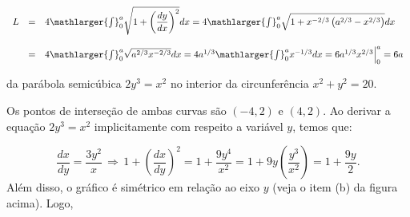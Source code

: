 \cleardoublepage\documentclass[../main.tex]{subfiles}
\begin{document}
\begin{ex}
\begin{compactenum}[a)]
\begin{solution}
\[ \begin{array}{rcl} L&=& 4\mathlarger{\int}^{a}_{0} \sqrt{ 1+ \left(\dfrac{dy}{dx}\right)^2} dx = 4 \mathlarger{\int}^{a}_{0} \sqrt{ 1+ x^{-2/3}\left(a^{2/3} -x^{2/3} \right)} dx \\ \\ &=& 4 \mathlarger{\int}^{a}_{0} \sqrt{ a^{2/3} x^{-2/3}} dx = 4a^{1/3} \mathlarger{\int}^{a}_{0} x^{-1/3} dx = 6 a^{1/3}x^{2/3} \Big{|}^{a}_{0}=6a\end{array} \]
\end{solution}
\begin{figure}[H]
\centering
{}\quad
{}
\end{figure}
\item da parábola semicúbica \(2y^3=x^2\) no interior da circunferência \(x^2+y^2=20\).

\begin{solution}
Os pontos de interseção de ambas curvas são \((-4,2)\) e \((4,2)\). Ao derivar a equação \(2y^3=x^2\) implicitamente com respeito a variável \(y\), temos que:

\[ \dfrac{dx}{dy}= \dfrac{3y^2}{x}\,\Rightarrow\,1+\left( \dfrac{dx}{dy}\right)^2 = 1+\dfrac{9y^4}{x^2}=1+9y \left(\dfrac{y^3}{x^2} \right) = 1+ \dfrac{9y}{2}. \]
Além disso, o gráfico é simétrico em relação ao eixo \(y\) (veja o item (b) da figura acima). Logo,


\end{solution}
\end{compactenum}
\end{ex}
\end{document}

